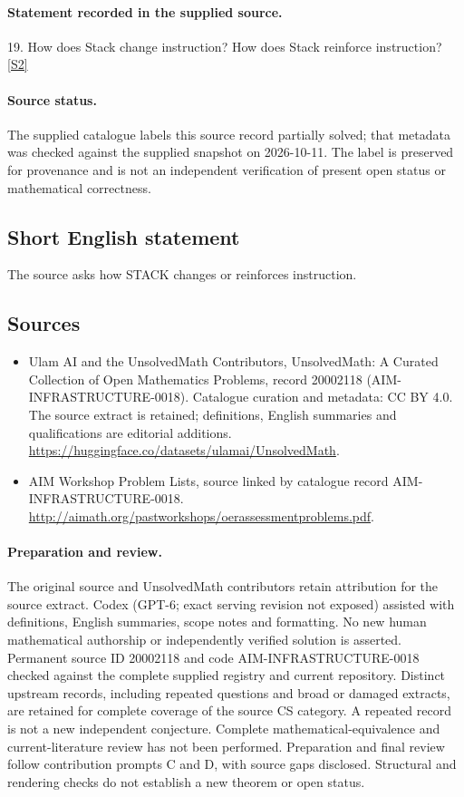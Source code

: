 \documentclass[11pt]{article}
\begin{document}
\paragraph{Statement recorded in the supplied source.}
19. How does Stack change instruction? How does Stack reinforce instruction? \href{http://aimath.org/pastworkshops/oerassessmentproblems.pdf}{[S2]}
\paragraph{Source status.}
The supplied catalogue labels this source record partially solved; that metadata was checked against the supplied snapshot on 2026-10-11. The label is preserved for provenance and is not an independent verification of present open status or mathematical correctness.
\subsection{Short English statement}
The source asks how STACK changes or reinforces instruction.
\subsection{Sources}
\begin{itemize}
\item[S1] Ulam AI and the UnsolvedMath Contributors, UnsolvedMath: A Curated Collection of Open Mathematics Problems, record 20002118 (AIM-INFRASTRUCTURE-0018). Catalogue curation and metadata: CC BY 4.0. The source extract is retained; definitions, English summaries and qualifications are editorial additions.
\url{https://huggingface.co/datasets/ulamai/UnsolvedMath}.
\item[S2] AIM Workshop Problem Lists, source linked by catalogue record AIM-INFRASTRUCTURE-0018.
\url{http://aimath.org/pastworkshops/oerassessmentproblems.pdf}.
\end{itemize}
\paragraph{Preparation and review.}
The original source and UnsolvedMath contributors retain attribution for the source extract. Codex (GPT-6; exact serving revision not exposed) assisted with definitions, English summaries, scope notes and formatting. No new human mathematical authorship or independently verified solution is asserted. Permanent source ID 20002118 and code AIM-INFRASTRUCTURE-0018 checked against the complete supplied registry and current repository. Distinct upstream records, including repeated questions and broad or damaged extracts, are retained for complete coverage of the source CS category. A repeated record is not a new independent conjecture. Complete mathematical-equivalence and current-literature review has not been performed. Preparation and final review follow contribution prompts C and D, with source gaps disclosed. Structural and rendering checks do not establish a new theorem or open status.
\label{end:20002118}
\end{document}
